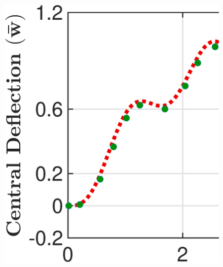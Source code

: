 \documentclass[3p,preprint,12pt]{elsarticle}
\begin{document}
\begin{figure}
\begin{minipage}{0.515\textwidth}
		\includegraphics[width=\linewidth]{Tran_Sin_NPSDT_Transient_h_By_a_1_5.eps}\\
	\end{minipage}\\
	\begin{minipage}{0.515\textwidth}
		\graphicspath{{./All_Images/}}
		\centering

\end{minipage}
\end{figure}
\end{document}
